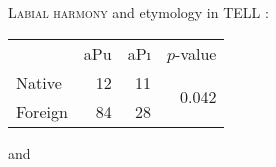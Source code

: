 


 
\citet{Inkelas2001}

\ex \textsc{Labial harmony} and etymology in TELL \citep[][187]{Inkelas2001}: \vspace{6pt} \\
\begin{tabular}{l r r r}
        & aPu & aPı & $p$-value \\
Native  & 12  & 11  & \multirow{2}{*}{0.042} \\
Foreign & 84  & 28  \\
\end{tabular}
\xe 

\citet{NiChiosain1993} and \citet{Ito1995b} 
